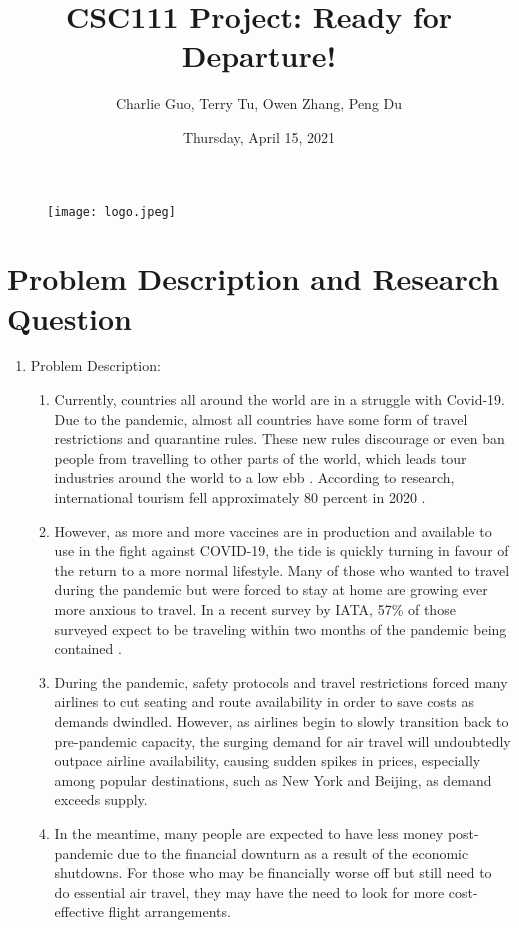 \documentclass[fontsize=11pt]{article}
\title{CSC111 Project: Ready for Departure!}
\author{Charlie Guo, Terry Tu, Owen Zhang, Peng Du}
\date{Thursday, April 15, 2021}
\begin{document}
\maketitle

\begin{figure}[h]
    \centering
    \texttt{[image: logo.jpeg]}
\end{figure}

\section*{Problem Description and Research Question}

\begin{enumerate}
    \item Problem Description:
        \begin{enumerate}
            \item Currently, countries all around the world are in a struggle with Covid-19. Due to the pandemic, almost all countries have some form of travel restrictions and quarantine rules. These new rules discourage or even ban people from travelling to other parts of the world, which leads tour industries around the world to a low ebb \cite{impacts}. According to research, international tourism fell approximately 80 percent in 2020 \cite{OECD}. 
            
            \item However, as more and more vaccines are in production and available to use in the fight against COVID-19, the tide is quickly turning in favour of the return to a more normal lifestyle. Many of those who wanted to travel during the pandemic but were forced to stay at home are growing ever more anxious to travel. In a recent survey by IATA, 57\% of those surveyed expect to be traveling within two months of the pandemic being contained \cite{travel}. 

            \item During the pandemic, safety protocols and travel restrictions forced many airlines to cut seating and route availability in order to save costs as demands dwindled. However, as airlines begin to slowly transition back to pre-pandemic capacity, the surging demand for air travel will undoubtedly outpace airline availability, causing sudden spikes in prices, especially among popular destinations, such as New York and Beijing, as demand exceeds supply. \cite{CNBC}
            
            \item In the meantime, many people are expected to have less money post-pandemic due to the financial downturn as a result of the economic shutdowns. For those who may be financially worse off but still need to do essential air travel, they may have the need to look for more cost-effective flight arrangements. 


\end{enumerate}
\end{enumerate}
\end{document}
